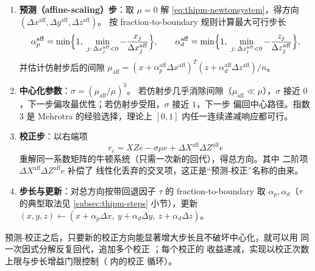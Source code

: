 \begin{enumerate}
  \item \textbf{预测（affine-scaling）步}：取 $\mu=0$ 解
        \eqref{eq:thipm-newtonsystem}，得方向
        $(\Delta x^{\mathrm{aff}},\Delta y^{\mathrm{aff}},\Delta z^{\mathrm{aff}})$。
        按 fraction-to-boundary 规则计算最大可行步长
        \begin{equation}\label{eq:thipm-ftb}
          \alpha_p^{\mathrm{aff}}
          =\min\Bigl\{1,\ \min_{j:\,\Delta x_j^{\mathrm{aff}}<0}
          -\frac{x_j}{\Delta x_j^{\mathrm{aff}}}\Bigr\},
          \qquad
          \alpha_d^{\mathrm{aff}}
          =\min\Bigl\{1,\ \min_{j:\,\Delta z_j^{\mathrm{aff}}<0}
          -\frac{z_j}{\Delta z_j^{\mathrm{aff}}}\Bigr\},
        \end{equation}
        并估计仿射步后的间隙
        $\mu_{\mathrm{aff}}=(x+\alpha_p^{\mathrm{aff}}\Delta x^{\mathrm{aff}})^{T}
        (z+\alpha_d^{\mathrm{aff}}\Delta z^{\mathrm{aff}})/n$。
  \item \textbf{中心化参数}：$\sigma=(\mu_{\mathrm{aff}}/\mu)^{3}$。
        若仿射步几乎消除间隙（$\mu_{\mathrm{aff}}\ll\mu$），$\sigma$ 接近
        $0$，下一步偏攻最优性；若仿射步受阻，$\sigma$ 接近 $1$，下一步
        偏回中心路径。指数 $3$ 是 Mehrotra 的经验选择，理论上
        $[0,1]$ 内任一连续递减响应都可行。
  \item \textbf{校正步}：以右端项
        \begin{equation}\label{eq:thipm-corrector}
          r_c=XZe-\sigma\mu e+\Delta X^{\mathrm{aff}}\Delta Z^{\mathrm{aff}}e
        \end{equation}
        重解同一系数矩阵的牛顿系统（只需一次新的回代），得总方向。其中
        二阶项 $\Delta X^{\mathrm{aff}}\Delta Z^{\mathrm{aff}}e$ 补偿了
        线性化丢弃的交叉项，这正是``预测-校正''名称的由来。
  \item \textbf{步长与更新}：对总方向按带回退因子 $\tau$ 的
        fraction-to-boundary 取
        $\alpha_p,\alpha_d$（$\tau$ 的典型取法见
        \ref{subsec:thipm-steps} 小节），更新
        $(x,y,z)\leftarrow(x+\alpha_p\Delta x,\ y+\alpha_d\Delta y,\
        z+\alpha_d\Delta z)$。
\end{enumerate}

\begin{remark}[Gondzio 多重中心校正]\label{rem:thipm-gondzio}
预测-校正之后，只要新的校正方向能显著增大步长且不破坏中心化，就可以用
同一次因式分解反复回代，追加多个校正 \cite{ipmgondzio1996}；每个校正的
收益递减，实现以校正次数上限与步长增益门限控制（
 内的校正
循环）。
\end{remark}


